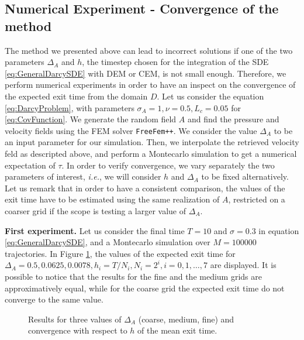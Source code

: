 \subsection{Numerical Experiment - Convergence of the method}

The method we presented above can lead to incorrect solutions if one of the two parameters $\Delta_A$ and $h$, the timestep chosen for the integration of the SDE \eqref{eq:GeneralDarcySDE} with DEM or CEM, is not small enough. Therefore, we perform numerical experiments in order to have an inspect on the convergence of the expected exit time from the domain $D$. Let us consider the equation \eqref{eq:DarcyProblem}, with parameters $\sigma_A = 1, \nu = 0.5, L_c = 0.05$ for \eqref{eq:CovFunction}. We generate the random field $A$ and find the pressure and velocity fields using the FEM solver \texttt{FreeFem++}. We consider the value $\Delta_A$ to be an input parameter for our simulation. Then, we interpolate the retrieved velocity feld as descripted above, and perform a Montecarlo simulation to get a numerical expectation of $\tau$. In order to verify convergence, we vary separately the two parameters of interest, \textit{i.e.}, we will consider $h$ and $\Delta_A$ to be fixed alternatively. Let us remark that in order to have a consistent comparison, the values of the exit time have to be estimated using the same realization of $A$, restricted on a coarser grid if the scope is testing a larger value of $\Delta_A$. 

\vspace{2mm}
\noindent \textbf{First experiment.} Let us consider the final time $T = 10$ and $\sigma = 0.3$ in equation \eqref{eq:GeneralDarcySDE}, and a Montecarlo simulation over $M = 100000$ trajectories. In Figure \ref{fig:ConvDeltaAh}, the values of the expected exit time for $\Delta_A = 0.5, 0.0625, 0.0078, h_i = T/N_i, N_i = 2^i, i = 0, 1, \dots, 7$ are displayed. It is possible to notice that the results for the fine and the medium grids are approximatively equal, while for the coarse grid the expected exit time do not converge to the same value. 

\begin{figure}[t]
    \centering
    \resizebox{0.8\linewidth}{!}{ }  
    \caption{Results for three values of $\Delta_A$ (coarse, medium, fine) and convergence with respect to $h$ of the mean exit time.}
    \label{fig:ConvDeltaAh}
\end{figure}
